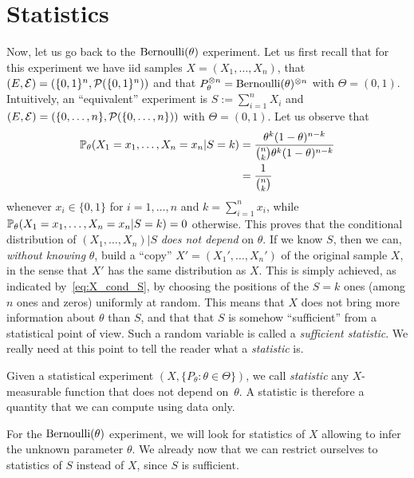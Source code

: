 \section{Statistics}
\label{sec:statistics}

Now, let us go back to the $\ber(\theta)$ experiment.
Let us first recall that for this experiment we have iid samples $X = (X_1, \ldots, X_n)$, that
$(E, \cE) = (\{0, 1\}^n, \cP(\{0, 1\}^n))$ and that $P_\theta^{\otimes n} = \ber(\theta)^{\otimes n}$ with $\Theta = (0, 1)$.
Intuitively, an ``equivalent'' experiment is $S := \sum_{i=1}^n X_i$ and $(E, \cE) = (\{ 0, \ldots, n\}, \cP(\{0, \ldots, n\}))$ with $\Theta = (0, 1)$.
Let us observe that
\begin{equation}
	\label{eq:X_cond_S}
	\begin{split}
	\P_\theta (X_1 = x_1, \ldots, X_n = x_n | S = k) &= 
	\frac{\theta^k (1 - \theta)^{n-k}}{\binom{n}{k} \theta^k (1 - \theta)^{n-k}} \\
	&= \frac{1}{\binom{n}{k}}		
	\end{split}
\end{equation}
whenever $x_i \in \{ 0, 1 \}$ for $i=1, \ldots, n$ and $k = \sum_{i=1}^n x_i$, while $\P_\theta (X_1 = x_1, \ldots, X_n = x_n | S = k) = 0$ otherwise.
This proves that the conditional distribution of $(X_1, \ldots, X_n) | S$ \emph{does not depend} on $\theta$.
If we know $S$, then we can, \emph{without knowing} $\theta$, build a ``copy'' $X' = (X_1', \ldots, X_n')$ of the original sample $X$, in the sense that $X'$ has the same distribution as $X$.
This is simply achieved, as indicated by~\eqref{eq:X_cond_S}, by choosing the positions of the $S=k$ ones (among $n$ ones and zeros) uniformly at random.
This means that $X$ does not bring more information about $\theta$ than $S$, and that that $S$ is somehow ``sufficient'' from a statistical point of view.
Such a random variable is called a \emph{sufficient statistic}.
We really need at this point to tell the reader what a \emph{statistic} is.
\begin{definition}
	Given a statistical experiment $(X, \{ P_\theta : \theta \in \Theta \})$, we call \emph{statistic} any $X$-measurable function that does not depend on~$\theta$.
	A statistic is therefore a quantity that we can compute using data only.
\end{definition}
For the $\ber(\theta)$ experiment, we will look for statistics of $X$ allowing to infer the unknown parameter $\theta$.
We already now that we can restrict ourselves to statistics of $S$ instead of $X$, since $S$ is  sufficient.

